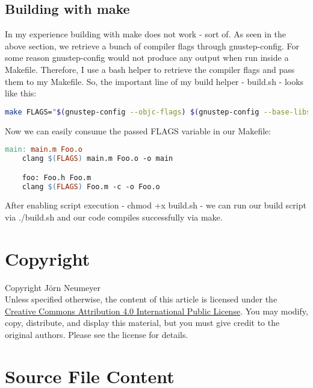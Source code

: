 \documentclass{article}
\begin{document}
  \subsection{Building with make}
  In my experience building with make does not work - sort of.
  As seen in the above section, we retrieve a bunch of compiler flags through gnustep-config.
  For some reason gnustep-config would not produce any output when run inside a Makefile.
  Therefore, I use a bash helper to retrieve the compiler flags and pass them to my Makefile.
  So, the important line of my build helper - build.sh - looks like this:
  \begin{lstlisting}[language=bash]
    make FLAGS="$(gnustep-config --objc-flags) $(gnustep-config --base-libs)"
  \end{lstlisting}
  Now we can easily consume the passed FLAGS variable in our Makefile:
  \begin{lstlisting}[language=make]
    main: main.m Foo.o
    clang $(FLAGS) main.m Foo.o -o main

    foo: Foo.h Foo.m
    clang $(FLAGS) Foo.m -c -o Foo.o
  \end{lstlisting}
  After enabling script execution - chmod +x build.sh - we can run our build script via ./build.sh and our code compiles successfully via make.
  \section{Copyright}
  Copyright \textcopyright {} J\"orn Neumeyer\\
  Unless specified otherwise, the content of this article is licensed under the \href{https://creativecommons.org/licenses/by/4.0/}{Creative Commons Attribution 4.0 International Public License}.
  You may modify, copy, distribute, and display this material, but you must give credit to the original authors. Please see the license for details.

  \section{Source File Content}
  
  
  
\end{document}
